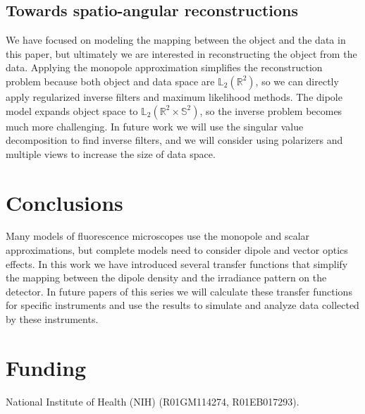 \documentclass[]{osa-article}
\providecommand{\mbb}[1]{\mathbb{#1}}
\begin{document}
\subsection{Towards spatio-angular reconstructions}
We have focused on modeling the mapping between the object and the data in this
paper, but ultimately we are interested in reconstructing the object from the
data. Applying the monopole approximation simplifies the reconstruction problem
because both object and data space are $\mbb{L}_2(\mbb{R}^2)$, so we can
directly apply regularized inverse filters and maximum likelihood methods. The
dipole model expands object space to $\mbb{L}_2(\mbb{R}^2\times \mbb{S}^2)$, so
the inverse problem becomes much more challenging. In future work we will use
the singular value decomposition to find inverse filters, and we will consider
using polarizers and multiple views to increase the size of data space. 

\section{Conclusions}
Many models of fluorescence microscopes use the monopole and scalar
  approximations, but complete models need to consider dipole and vector optics
  effects. In this work we have introduced several transfer functions that
  simplify the mapping between the dipole density and the irradiance pattern on
  the detector. In future papers of this series we will calculate these transfer
  functions for specific instruments and use the results to simulate and analyze
  data collected by these instruments.%

\section*{Funding}
National Institute of Health (NIH) (R01GM114274, R01EB017293).
\end{document}
